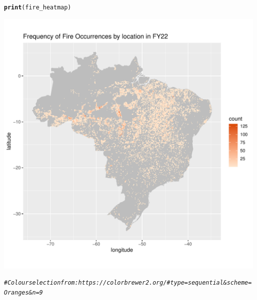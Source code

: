 \documentclass{article}\usepackage[]{graphicx}\usepackage[]{xcolor}
\makeatletter
\def\maxwidth{ %
  \ifdim\Gin@nat@width>\linewidth
    \linewidth
  \else
    \Gin@nat@width
  \fi
}
\newcommand{\hlcom}[1]{\textcolor[rgb]{0.678,0.584,0.686}{\textit{#1}}}%
\newcommand{\hlstd}[1]{\textcolor[rgb]{0.345,0.345,0.345}{#1}}%
\newcommand{\hlkwd}[1]{\textcolor[rgb]{0.737,0.353,0.396}{\textbf{#1}}}%
\newenvironment{kframe}{%
 \def\at@end@of@kframe{}%
 \ifinner\ifhmode%
  \def\at@end@of@kframe{\end{minipage}}%
  \begin{minipage}{\columnwidth}%
 \fi\fi%
 \def\FrameCommand##1{\hskip\@totalleftmargin \hskip-\fboxsep
 \colorbox{shadecolor}{##1}\hskip-\fboxsep
     \hskip-\linewidth \hskip-\@totalleftmargin \hskip\columnwidth}%
 \MakeFramed {\advance\hsize-\width
   \@totalleftmargin\z@ \linewidth\hsize
   \@setminipage}}%
 {\par\unskip\endMakeFramed%
 \at@end@of@kframe}
\newenvironment{knitrout}{}{} %
\makeatother
\begin{document}
\begin{knitrout}
\begin{kframe}
\begin{alltt}
\hlkwd{print}\hlstd{(fire_heatmap)}
\end{alltt}
\end{kframe}
\includegraphics[width=\maxwidth]{figure/fire-by-location-fy22-1} 
\begin{kframe}\begin{alltt}
\hlcom{# Colour selection from: https://colorbrewer2.org/#type=sequential&scheme=Oranges&n=9}
\end{alltt}
\end{kframe}
\end{knitrout}
\end{document}
